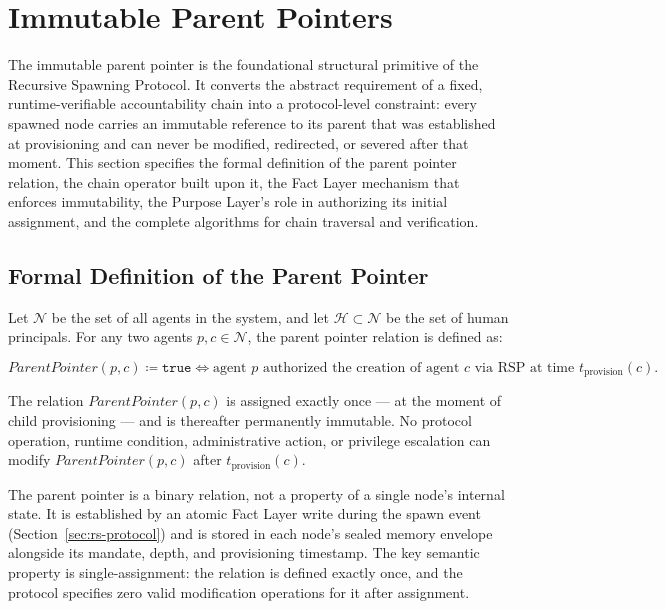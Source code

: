 \section{Immutable Parent Pointers}
\label{sec:immutable-parent-pointers}

The immutable parent pointer is the foundational structural primitive of the Recursive Spawning Protocol. It converts the abstract requirement of a fixed, runtime-verifiable accountability chain into a protocol-level constraint: every spawned node carries an immutable reference to its parent that was established at provisioning and can never be modified, redirected, or severed after that moment. This section specifies the formal definition of the parent pointer relation, the chain operator built upon it, the Fact Layer mechanism that enforces immutability, the Purpose Layer's role in authorizing its initial assignment, and the complete algorithms for chain traversal and verification.

\subsection{Formal Definition of the Parent Pointer}
\label{sec:parent-pointer-definition}

\begin{dfn}
\label{dfn:parent-pointer}
Let $\mathcal{N}$ be the set of all agents in the system, and let $\mathcal{H} \subset \mathcal{N}$ be the set of human principals. For any two agents $p, c \in \mathcal{N}$, the parent pointer relation is defined as:

\begin{equation}
\label{eq:parent-pointer}
ParentPointer(p, c) \coloneq \texttt{true} \iff \text{agent } p \text{ authorized the creation of agent } c \text{ via RSP at time } t_{\text{provision}}(c).
\end{equation}

The relation $ParentPointer(p, c)$ is assigned exactly once — at the moment of child provisioning — and is thereafter permanently immutable. No protocol operation, runtime condition, administrative action, or privilege escalation can modify $ParentPointer(p, c)$ after $t_{\text{provision}}(c)$.
\end{dfn}

The parent pointer is a binary relation, not a property of a single node's internal state. It is established by an atomic Fact Layer write during the spawn event (Section~\ref{sec:rs-protocol}) and is stored in each node's sealed memory envelope alongside its mandate, depth, and provisioning timestamp. The key semantic property is single-assignment: the relation is defined exactly once, and the protocol specifies zero valid modification operations for it after assignment.

